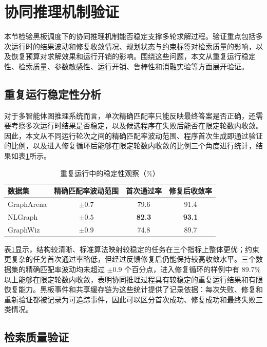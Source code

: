 \section{协同推理机制验证}
\label{sec:system_validation}

本节检验黑板调度下的协同推理机制能否稳定支撑多轮求解过程。验证重点包括多次运行时的结果波动和修复收敛情况、规划状态与约束标签对检索质量的影响，以及恢复预算对求解效果和运行开销的影响。围绕这些问题，本文从重复运行稳定性、检索质量、参数敏感性、运行开销、鲁棒性和消融实验等方面展开验证。

\subsection{重复运行稳定性分析}

对于多智能体图推理系统而言，单次精确匹配率只能反映最终答案是否正确，还需要考察多次运行时结果是否稳定，以及候选程序在失败后能否在限定轮数内收敛。因此，本文从不同运行轮次之间的精确匹配率波动范围、程序首次生成即通过验证的比例，以及进入修复循环后能够在限定轮数内收敛的比例三个角度进行统计，结果如表\ref{tab:stability_observation}所示。

\begin{table}[htbp]
\centering
\caption{重复运行中的稳定性观察（\%）}
\label{tab:stability_observation}
\begin{tabular}{lccc}
\toprule
数据集 & 精确匹配率波动范围 & 首次通过率 & 修复后收敛率 \\
\midrule
GraphArena & $\pm0.7$ & 79.6 & 91.4 \\
NLGraph & \textbf{$\pm0.5$} & \textbf{82.3} & \textbf{93.1} \\
GraphWiz & $\pm0.9$ & 74.8 & 89.7 \\
\bottomrule
\end{tabular}
\end{table}

表\ref{tab:stability_observation}显示，结构较清晰、标准算法映射较稳定的任务在三个指标上整体更优；约束更复杂的任务首次通过率略低，但经过反馈修复后仍能保持较高收敛水平。三个数据集的精确匹配率波动均未超过 $\pm0.9$ 个百分点，进入修复循环的样例中有 89.7\% 以上能够在限定轮数内收敛，表明协同推理过程具有较稳定的重复运行结果和有限恢复能力。黑板事件和共享缓存链为这些统计提供了记录依据：每次失败、修复和重新验证都被记录为可追踪事件，因此可以区分首次成功、修复成功和最终失败三类情况。

\subsection{检索质量验证}

